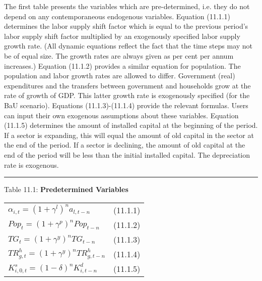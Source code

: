 \documentclass{article}
\begin{document}
The first table presents the variables which are pre-determined, i.e. they do not depend on any contemporaneous endogenous variables. Equation (11.1.1) determines the labor supply shift factor which is equal to the previous period’s labor supply shift factor multiplied by an exogenously specified labor supply growth rate. (All dynamic equations reflect the fact that the time steps may not be of equal size. The growth rates are always given as per cent per annum increases.) Equation (11.1.2) provides a similar equation for population. The population and labor growth rates are allowed to differ. Government (real) expenditures and the transfers between government and households grow at the rate of growth of GDP. This latter growth rate is exogenously specified (for the BaU scenario). Equations (11.1.3)-(11.1.4) provide the relevant formulas. Users can input their own exogenous assumptions about these variables. Equation (11.1.5) determines the amount of installed capital at the beginning of the period. If a sector is expanding, this will equal the amount of old capital in the sector at the end of the period. If a sector is declining, the amount of old capital at the end of the period will be less than the initial installed capital. The depreciation rate is exogenous.

\noindent\rule{\linewidth}{0.4pt}
\begin{center}
\begin{large}
{\centering Table 11.1: \textbf{Predetermined Variables} \par}


\begin{tabular}{>{\raggedright}p{} l}

$\alpha_{i, t} = \left(1 + \gamma^l\right)^n a_{l, t-n}$ & (11.1.1) \\[15pt]

$Pop_t = \left(1 + \gamma^p\right)^n Pop_{t-n}$ & (11.1.2) \\[15pt]

$TG_t = \left(1 + \gamma^y\right)^n TG_{t-n}$ & (11.1.3) \\[15pt]

$TR^h_{g, t} = \left(1 + \gamma^y\right)^n TR^h_{g, t-n}$ & (11.1.4) \\[15pt]

$K^s_{i, 0, t} = \left(1 - \delta\right)^n K^d_{i, t-n}$ & (11.1.5) \\[20pt]

\hline
\end{tabular}
\end{large}
\end{center}
\end{document}
